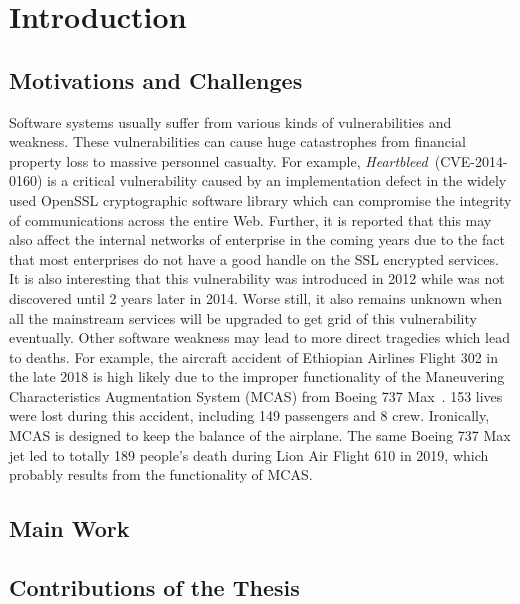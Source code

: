 
\chapter{Introduction} \label{ch:introduction}


\section{Motivations and Challenges}
Software systems usually suffer from various kinds of vulnerabilities and weakness. These vulnerabilities can cause huge catastrophes from financial property loss to massive personnel casualty. For example, \emph{Heartbleed}~\cite{heartbleed}(CVE-2014-0160) is a critical vulnerability caused by an implementation defect in the widely used OpenSSL cryptographic software library which can compromise the integrity of communications across the entire Web. Further, it is reported that this may also affect the internal networks of enterprise in the coming years due to the fact that most enterprises do not have a good handle on the SSL encrypted services. It is also interesting that this vulnerability was introduced in 2012 while was not discovered until 2 years later in 2014. Worse still, it also remains unknown when all the mainstream services will be upgraded to get grid of this vulnerability eventually. Other software weakness may lead to more direct tragedies which lead to deaths. For example, the aircraft accident of Ethiopian Airlines Flight 302 in the late 2018 is high likely due to the improper functionality of the Maneuvering Characteristics Augmentation System (MCAS) from Boeing 737 Max~\cite{boeing_Ethiopian}. 153 lives were lost during this accident, including 149 passengers and 8 crew. Ironically, MCAS is designed to keep the balance of the airplane. The same Boeing 737 Max jet led to totally 189 people's death during Lion Air Flight 610 in 2019, which probably results from the functionality of MCAS.

\section{Main Work}

\section{Contributions of the Thesis}

